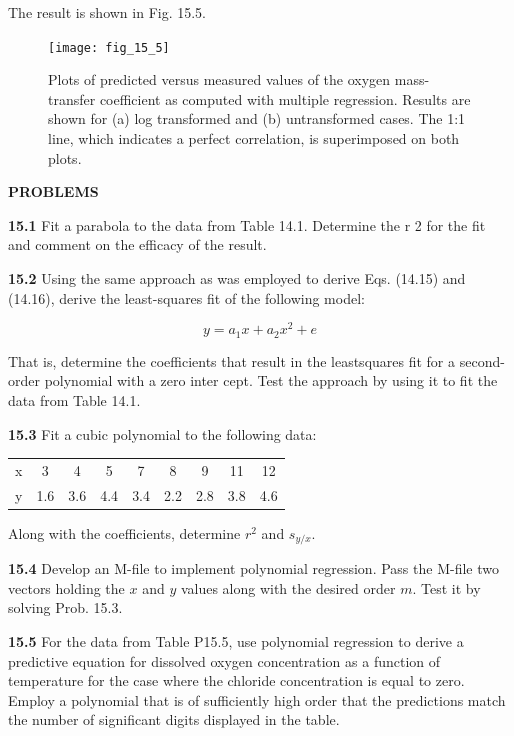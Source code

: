 \documentclass[../main.tex]{subfiles}
\begin{document}
\noindent The result is shown in Fig. 15.5.

\begin{figure}[H]
	\centering
	\texttt{[image: fig\_15\_5]}
	\caption{\textsf{Plots of predicted versus measured values of the oxygen mass-transfer coefficient as computed with multiple regression. Results are shown for (a) log transformed and (b) untransformed cases. The 1:1 line, which indicates a perfect correlation, is superimposed on both plots.}}
	\label{fig:fig_15_5}
\end{figure}

\noindent\textbf{PROBLEMS}\\

\begin{multicols}{2}
    \noindent\textbf{15.1}  Fit a parabola to the data from Table 14.1. Determine
	the r 2 for the fit and comment on the efficacy of the result.

	\noindent\textbf{15.2} Using the same approach as was employed to derive
	Eqs. (14.15) and (14.16), derive the least-squares fit of the
	following model:

	$$
		y = a_1 x + a_2 x^2 + e
	$$

	\noindent That is, determine the coefficients that result in the leastsquares fit for a second-order polynomial with a zero inter	cept. Test the approach by using it to fit the data from
	Table 14.1.

	\noindent\textbf{15.3} Fit a cubic polynomial to the following data:

	\noindent
	\begin{tabular}{l c c c c c c c c}
		x & 3 & 4 & 5 & 7 & 8 & 9 & 11 & 12 \\
		y & 1.6 & 3.6 & 4.4 & 3.4 & 2.2 & 2.8 & 3.8 & 4.6
	\end{tabular}

	\noindent Along with the coefficients, determine $r^2$ and $s_{y/x}$.

	\noindent\textbf{15.4} Develop an M-file to implement polynomial regression. Pass the M-file two vectors holding the $x$ and $y$
	values along with the desired order $m$. Test it by solving
	Prob. 15.3.

	\noindent\textbf{15.5}  For the data from Table P15.5, use polynomial
	regression to derive a predictive equation for dissolved
	oxygen concentration as a function of temperature for the
	case where the chloride concentration is equal to zero.
	Employ a polynomial that is of sufficiently high order that
	the predictions match the number of significant digits displayed in the table.


\end{multicols}
\end{document}
